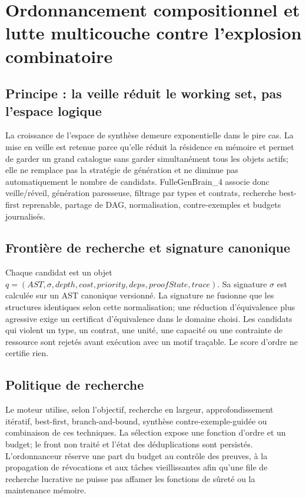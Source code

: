 \documentclass[11pt,a4paper]{article}
\begin{document}
\section{Ordonnancement compositionnel et lutte multicouche contre l'explosion combinatoire}
\subsection{Principe : la veille réduit le working set, pas l'espace logique}
La croissance de l'espace de synthèse demeure exponentielle dans le pire cas. La mise en veille est retenue parce qu'elle réduit la résidence en mémoire et permet de garder un grand catalogue sans garder simultanément tous les objets actifs; elle ne remplace pas la stratégie de génération et ne diminue pas automatiquement le nombre de candidats. FulleGenBrain\_4 associe donc veille/réveil, génération paresseuse, filtrage par types et contrats, recherche best-first reprenable, partage de DAG, normalisation, contre-exemples et budgets journalisés.

\subsection{Frontière de recherche et signature canonique}
Chaque candidat est un objet \(q=(AST,\sigma,depth,cost,priority,deps,proofState,trace)\). Sa signature \(\sigma\) est calculée sur un AST canonique versionné. La signature ne fusionne que les structures identiques selon cette normalisation; une réduction d'équivalence plus agressive exige un certificat d'équivalence dans le domaine choisi. Les candidats qui violent un type, un contrat, une unité, une capacité ou une contrainte de ressource sont rejetés avant exécution avec un motif traçable. Le score d'ordre ne certifie rien.

\subsection{Politique de recherche}
Le moteur utilise, selon l'objectif, recherche en largeur, approfondissement itératif, best-first, branch-and-bound, synthèse contre-exemple-guidée ou combinaison de ces techniques. La sélection expose une fonction d'ordre et un budget; le front non traité et l'état des déduplications sont persistés. L'ordonnanceur réserve une part du budget au contrôle des preuves, à la propagation de révocations et aux tâches vieillissantes afin qu'une file de recherche lucrative ne puisse pas affamer les fonctions de sûreté ou la maintenance mémoire.
\end{document}
